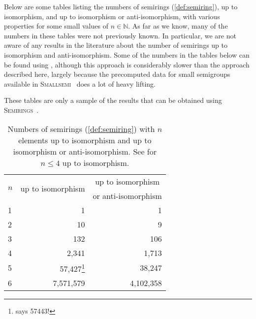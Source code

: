 \documentclass{article}
\theoremstyle{definition}
\theoremstyle{plain}
\newcommand{\Smallsemi}{\textsc{Smallsemi}~\cite{Smallsemi}\xspace}
\newcommand{\Semirings}{\textsc{Semirings}~\cite{Semirings}\xspace}
\begin{document}
Below are some tables listing the numbers of semirings (\cref{def:semiring}),
up to isomorphism, and up to isomorphism or anti-isomorphism, with various
properties for some small values of $n\in \mathbb{N}$.
As far as we know, many of the numbers in these tables were not previously
known. In particular, we are not aware of any results in the literature about
the number of semirings up to isomorphism and anti-isomorphism.
Some of the numbers in the tables below can be found using
\cite{baueralg}, although this approach is considerably slower than the
approach described here, largely because the precomputed data for small
semigroups available in \Smallsemi does a lot of heavy lifting.

These tables are only a sample of the results that can be obtained
using \Semirings.

\begin{table}[ht]
  \centering
  \begin{tabular}{l|r|r}
    \multirow{2}{*}{$n$} & \multicolumn{1}{|c|}{\multirow{2}{*}{up to
    isomorphism}} & \multicolumn{1}{c}{up to isomorphism} \\
    & & \multicolumn{1}{l}{or anti-isomorphism}\\
    \midrule
    1 & 1                    & 1         \\
    2 & 10                   & 9         \\
    3 & 132                  & 106       \\
    4 & 2,341                & 1,713     \\
    5 & 57,427\footnote{\cite{baueralg} says 57443!}     & 38,247    \\
    6 & 7,571,579  & 4,102,358
  \end{tabular}
  \caption{Numbers of semirings (\cref{def:semiring}) with $n$ elements up to isomorphism and up
    to isomorphism or anti-isomorphism. See \cite{MSsemirings} for \(n\leq4\) up to isomorphism.}
  \label{tab:semirings}
\end{table}
\end{document}
